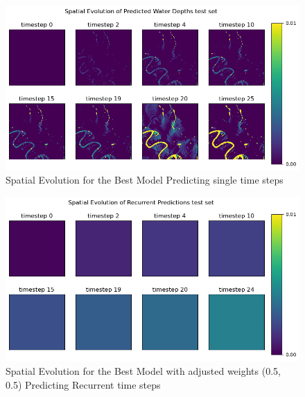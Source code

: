 \begin{figure}[tbph]
	\centering
	\includegraphics[width=0.8\linewidth, height=0.3\textheight]{Figures/Results/Final_Results/Best_Model_SS_SS_test_set}
	\caption[Spatial Single Time step Predictions]{Spatial Evolution for the Best Model Predicting single time steps}
	\label{fig:BMS-spatial}
\end{figure}


\begin{figure}[tbph]
	\centering
	\includegraphics[width=0.8\linewidth, height=0.3\textheight]{Figures/Results/Final_Results/Best_SS_adjusted_weights(5,5)_spatial}
	\caption[Best Model with adjusted weights Spatial recurrent time step Predictions]{Spatial Evolution for the Best Model with adjusted weights (0.5, 0.5) Predicting Recurrent time steps}
	\label{fig:adjusted-spatial}
\end{figure}


